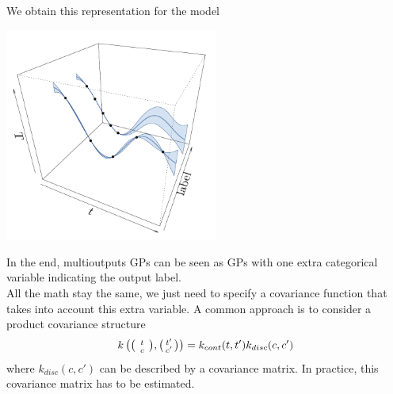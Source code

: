 \documentclass{beamer}
\newenvironment{psmallmatrix}
  {\left(\begin{smallmatrix}}
  {\end{smallmatrix}\right)}
\begin{document}
\begin{frame}{}
\begin{example}
	We obtain this representation for the model
	\begin{center}
	\includegraphics[height=7cm]{figures/R/ch2_multiGPR}
	\end{center}
\end{example}
\end{frame}


\begin{frame}{}
In the end, multioutputs GPs can be seen as GPs with one extra categorical variable indicating the output label.\\
\vspace{5mm}
All the math stay the same, we just need to specify a covariance function that takes into account this extra variable. A common approach is to consider a product covariance structure
\begin{equation*}
k\left( \begin{psmallmatrix} \phantom{'}t\phantom{'} \\ \phantom{'}c\phantom{'} \end{psmallmatrix},\begin{psmallmatrix} t' \\ c' \end{psmallmatrix} \right) = k_{cont}(t,t') k_{disc}(c,c')
\end{equation*}
where $k_{disc}(c,c')$ can be described by a covariance matrix. In practice, this covariance matrix has to be estimated. 

\end{frame}
\end{document}
